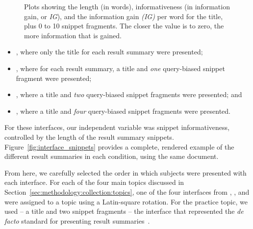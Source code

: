 \begin{figure}[t!]
    \centering
    \caption[Information gain plots]{Plots showing the length (in words), informativeness (in information gain, or \emph{IG}), and the information gain \emph{(IG)} per word for the title, plus 0 to 10 snippet fragments. The closer the value is to zero, the more information that is gained.}
    \label{fig:ig_plots}
\end{figure}

\begin{itemize}
    \item{, where only the title for each result summary were presented;}
    \item{, where for each result summary, a title and \emph{one} query-biased snippet fragment were presented;}
    \item{, where a title and \emph{two} query-biased snippet fragments were presented; and}
    \item{, where a title and \emph{four} query-biased snippet fragments were presented.}
\end{itemize}

For these interfaces, our independent variable was snippet informativeness, controlled by the length of the result summary snippets. Figure~\ref{fig:interface_snippets} provides a complete, rendered example of the different result summaries in each condition, using the same document.

From here, we carefully selected the order in which subjects were presented with each interface. For each of the four main topics discussed in Section~\ref{sec:methodology:collection:topics}, one of the four interfaces from , ,  and  were assigned to a topic using a Latin-square rotation. For the practice topic, we used  -- a title and two snippet fragments -- the interface that represented the \emph{de facto} standard for presenting result summaries~\citep{hearst2009_search}.

